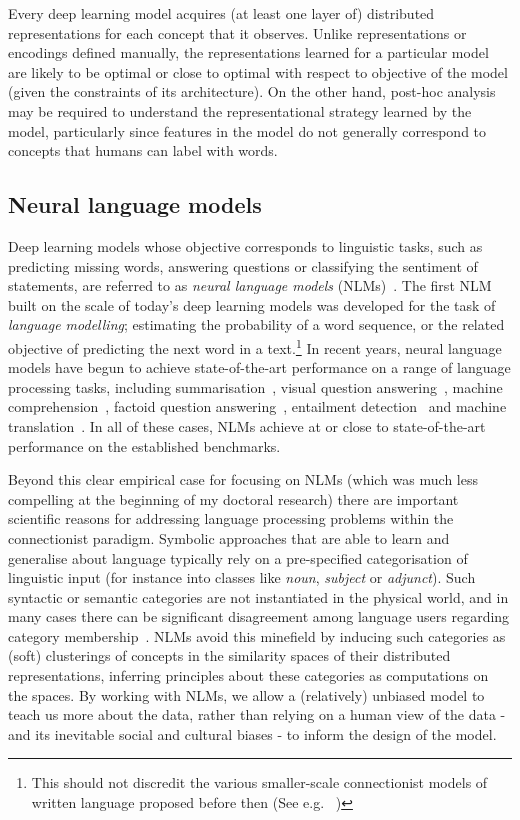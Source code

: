Every deep learning model acquires (at least one layer of) distributed representations for each concept that it observes. Unlike representations or encodings defined manually, the representations learned for a particular model are likely to be optimal or close to optimal with respect to objective of the model (given the constraints of its architecture). On the other hand, post-hoc analysis may be required to understand the representational strategy learned by the model, particularly since features in the model do not generally correspond to concepts that humans can label with words.        

\subsection{Neural language models} Deep learning models whose objective corresponds to linguistic tasks, such as predicting missing words, answering questions or classifying the sentiment of statements, are referred to as \emph{neural language models} (NLMs)~\citep{bengio2003neural}. The first NLM built on the scale of today's deep learning models was developed for the task of \emph{language modelling}; estimating the probability of a word sequence, or the related objective of predicting the next word in a text.\footnote{This should not discredit the various smaller-scale connectionist models of written language proposed before then (See e.g. ~\citealt{elman1990finding,miikkulainen1991natural})} In recent years, neural language models have begun to achieve state-of-the-art performance on a range of language processing tasks, including summarisation~\citep{rush2015neural}, visual question answering~\citep{antol2015vqa}, machine comprehension~\citep{hill2015goldilocks}, factoid question answering~\citep{bordes2014question}, entailment detection~\citep{rocktaschel2015reasoning} and machine translation~\citep{bahdanau2014neural}. In all of these cases, NLMs achieve at or close to state-of-the-art performance on the established benchmarks.  

Beyond this clear empirical case for focusing on NLMs (which was much less compelling at the beginning of my doctoral research) there are important scientific reasons for addressing language processing problems within the connectionist paradigm. Symbolic approaches that are able to learn and generalise about language typically rely on a pre-specified categorisation of linguistic input (for instance into classes like \emph{noun}, \emph{subject} or \emph{adjunct}). Such syntactic or semantic categories are not instantiated in the physical world, and in many cases there can be significant disagreement among language users regarding category membership~\citep{anward1997parts}. NLMs avoid this minefield by inducing such categories as (soft) clusterings of concepts in the similarity spaces of their distributed representations, inferring principles about these categories as computations on the spaces. By working with NLMs, we allow a (relatively) unbiased model to teach us more about the data, rather than relying on a human view of the data - and its inevitable social and cultural biases - to inform the design of the model. 

